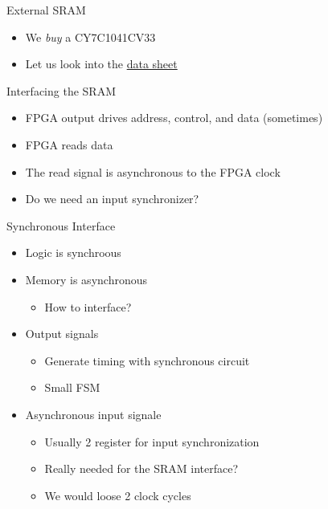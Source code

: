 \begin{frame}[fragile]{External SRAM}
\begin{itemize}
\item We \emph{buy} a CY7C1041CV33
\item Let us look into the \href{https://cn.inside.dtu.dk/cnnet/filesharing/download/618360ca-01b4-42e4-86e2-765835963deb}{data sheet}
\end{itemize}
\end{frame}

\begin{frame}[fragile]{Interfacing the SRAM}
\begin{itemize}
\item FPGA output drives address, control, and data (sometimes)
\item FPGA reads data
\item The read signal is asynchronous to the FPGA clock
\item Do we need an input synchronizer?
\end{itemize}
\end{frame}

\begin{frame}[fragile]{Synchronous Interface}
\begin{itemize}
\item Logic is synchroous
\item Memory is asynchronous
\begin{itemize}
\item How to interface?
\end{itemize}
\item Output signals
\begin{itemize}
\item Generate timing with synchronous circuit
\item Small FSM
\end{itemize}
\item Asynchronous input signale
\begin{itemize}
\item Usually 2 register for input synchronization
\item Really needed for the SRAM interface?
\item We would loose 2 clock cycles
\end{itemize}
\end{itemize}
\end{frame}


